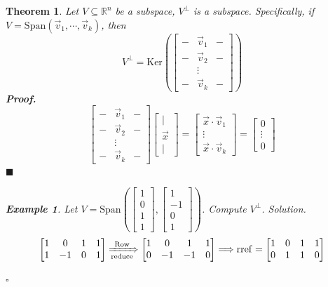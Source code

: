 \documentclass[12pt, a4paper]{article}
\newtheorem{thm}{Theorem}[subsection]
\newtheorem{eg}{Example}[subsection]
\newenvironment*{sol}{\indent\textit{Solution. }}{\hfill{$\square$}\par}
\newenvironment*{prf}{\indent\textbf{\textit{Proof. }}}{\hfill $\blacksquare$\par}
\def\R{{\mathbb{R}}}
\def\rref{\mathrm{rref}}
\def\Span{\mathrm{Span}}
\def\Ker{\mathrm{Ker}}
\def\vecx{\vec{x}}
\def\vecv{\vec{v}}
\begin{document}
\begin{thm}
	Let $V\subseteq\R^n$ be a subspace, $V^\perp$ is a subspace. Specifically, if $V=\Span(\vecv_1,\cdots,\vecv_k)$, then \[V^\perp=\Ker\left(\begin{bmatrix}-&\vecv_1&-\\-&\vecv_2&-\\&\vdots&\\-&\vecv_k&-\end{bmatrix}\right)\]
	\begin{prf}
		\[\begin{bmatrix}-&\vecv_1&-\\-&\vecv_2&-\\&\vdots&\\-&\vecv_k&-\end{bmatrix}\begin{bmatrix}|\\\vecx\\|\end{bmatrix}=\begin{bmatrix}\vecx\cdot\vecv_1\\\vdots\\\vecx\cdot\vecv_k\end{bmatrix}=\begin{bmatrix}0\\\vdots\\0\end{bmatrix}\]	
	\end{prf}
	\begin{eg}
		Let $V=\Span\left(\begin{bmatrix}1\\0\\1\\1\end{bmatrix},\begin{bmatrix}1\\-1\\0\\1\end{bmatrix}\right)$. Compute $V^\perp$.	
	\begin{sol}
		\[\begin{bmatrix}1&0	&1&1\\1&-1&0&1\end{bmatrix}\xRightarrow[\text{reduce}]{\text{Row}}\begin{bmatrix}1&0&1&1\\0&-1&-1&0\end{bmatrix}\Longrightarrow\rref=\begin{bmatrix}1&0&1&1\\0&1&1&0\end{bmatrix}\]

\end{sol}
\end{eg}
\end{thm}
\end{document}

